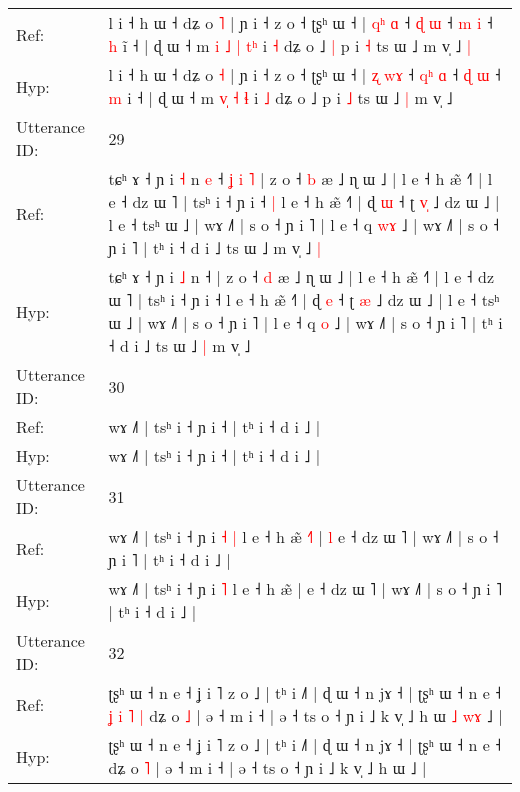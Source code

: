 \documentclass[10pt]{article}
\DeclareRobustCommand{\hl}[1]{{\textcolor{red}{#1}}}
\begin{document}
\begin{longtable}{ll}
Ref: & l i ˧ h ɯ ˧ dʑ o \hl{˥} | ɲ i ˧ z o ˧ ʈʂʰ ɯ ˧ | \hl{q}\hl{ʰ}\hl{ }\hl{ɑ} ˧ \hl{}\hl{ɖ} \hl{ɯ} ˧ \hl{m} \hl{i} ˧ \hl{h} i\hl{̃} ˧ | ɖ ɯ ˧ m \hl{i}\hl{ }\hl{˩} \hl{|} \hl{t}\hl{ʰ} i \hl{˧} dʑ o ˩\hl{ }\hl{|} p i \hl{˧} ts ɯ ˩\hl{}\hl{} m v̩ ˩\hl{ }\hl{|}
 \\
Hyp: & l i ˧ h ɯ ˧ dʑ o \hl{˧} | ɲ i ˧ z o ˧ ʈʂʰ ɯ ˧ | \hl{ʐ}\hl{ }\hl{w}\hl{ɤ} ˧ \hl{q}\hl{ʰ} \hl{ɑ} ˧ \hl{ɖ} \hl{ɯ} ˧ \hl{m} i\hl{} ˧ | ɖ ɯ ˧ m \hl{}\hl{v}\hl{̩} \hl{˧} \hl{}\hl{ɬ} i \hl{˩} dʑ o ˩\hl{}\hl{} p i \hl{˩} ts ɯ ˩\hl{ }\hl{|} m v̩ ˩\hl{}\hl{}
 \\
\midrule
Utterance ID: & 29 \\
Ref: & tɕʰ ɤ ˧ ɲ i \hl{˧} n\hl{ }\hl{e} ˧\hl{ }\hl{ʝ}\hl{ }\hl{i}\hl{ }\hl{˥} | z o ˧ \hl{b} æ ˩ ɳ ɯ ˩ | l e ˧ h æ̃ ˧˥ | l e ˧ dz ɯ ˥ | tsʰ i ˧ ɲ i ˧\hl{ }\hl{|} l e ˧ h æ̃ ˧˥ | ɖ \hl{ɯ} ˧ ʈ \hl{v}\hl{̩} ˩ dz ɯ ˩ | l e ˧ tsʰ ɯ ˩ | wɤ ˩˥ | s o ˧ ɲ i ˥ | l e ˧ q \hl{w}\hl{ɤ} ˩ | wɤ ˩˥ | s o ˧ ɲ i ˥ | tʰ i ˧ d i ˩ ts ɯ ˩\hl{}\hl{} m v̩ ˩\hl{ }\hl{|}
 \\
Hyp: & tɕʰ ɤ ˧ ɲ i \hl{˩} n\hl{}\hl{} ˧\hl{}\hl{}\hl{}\hl{}\hl{}\hl{} | z o ˧ \hl{d} æ ˩ ɳ ɯ ˩ | l e ˧ h æ̃ ˧˥ | l e ˧ dz ɯ ˥ | tsʰ i ˧ ɲ i ˧\hl{}\hl{} l e ˧ h æ̃ ˧˥ | ɖ \hl{e} ˧ ʈ \hl{}\hl{æ} ˩ dz ɯ ˩ | l e ˧ tsʰ ɯ ˩ | wɤ ˩˥ | s o ˧ ɲ i ˥ | l e ˧ q \hl{}\hl{o} ˩ | wɤ ˩˥ | s o ˧ ɲ i ˥ | tʰ i ˧ d i ˩ ts ɯ ˩\hl{ }\hl{|} m v̩ ˩\hl{}\hl{}
 \\
\midrule
Utterance ID: & 30 \\
Ref: & wɤ ˩˥ | tsʰ i ˧ ɲ i ˧ | tʰ i ˧ d i ˩ |
 \\
Hyp: & wɤ ˩˥ | tsʰ i ˧ ɲ i ˧ | tʰ i ˧ d i ˩ |
 \\
\midrule
Utterance ID: & 31 \\
Ref: & wɤ ˩˥ | tsʰ i ˧ ɲ i\hl{ }\hl{˧} \hl{|} l e ˧ h æ̃\hl{ }\hl{˧}\hl{˥} |\hl{ }\hl{l} e ˧ dz ɯ ˥ | wɤ ˩˥ | s o ˧ ɲ i ˥ | tʰ i ˧ d i ˩ |
 \\
Hyp: & wɤ ˩˥ | tsʰ i ˧ ɲ i\hl{}\hl{} \hl{˥} l e ˧ h æ̃\hl{}\hl{}\hl{} |\hl{}\hl{} e ˧ dz ɯ ˥ | wɤ ˩˥ | s o ˧ ɲ i ˥ | tʰ i ˧ d i ˩ |
 \\
\midrule
Utterance ID: & 32 \\
Ref: & ʈʂʰ ɯ ˧ n e ˧ ʝ i ˥ z o ˩ | tʰ i ˩˥ | ɖ ɯ ˧ n jɤ ˧ | ʈʂʰ ɯ ˧ n e ˧\hl{ }\hl{ʝ}\hl{ }\hl{i}\hl{ }\hl{˥}\hl{ }\hl{|} dʑ o \hl{˩} | ə ˧ m i ˧ | ə ˧ ts o ˧ ɲ i ˩ k v̩ ˩ h ɯ\hl{ }\hl{˩}\hl{ }\hl{w}\hl{ɤ} ˩ |
 \\
Hyp: & ʈʂʰ ɯ ˧ n e ˧ ʝ i ˥ z o ˩ | tʰ i ˩˥ | ɖ ɯ ˧ n jɤ ˧ | ʈʂʰ ɯ ˧ n e ˧\hl{}\hl{}\hl{}\hl{}\hl{}\hl{}\hl{}\hl{} dʑ o \hl{˥} | ə ˧ m i ˧ | ə ˧ ts o ˧ ɲ i ˩ k v̩ ˩ h ɯ\hl{}\hl{}\hl{}\hl{}\hl{} ˩ |

\end{longtable}
\end{document}
